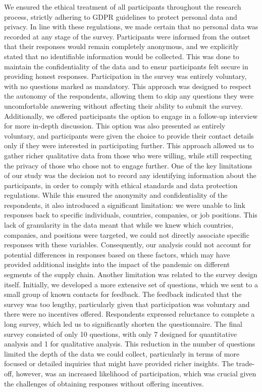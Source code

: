We ensured the ethical treatment of all participants throughout the research process, strictly adhering to GDPR guidelines to protect personal data and privacy. In line with these regulations, we made certain that no personal data was recorded at any stage of the survey. Participants were informed from the outset that their responses would remain completely anonymous, and we explicitly stated that no identifiable information would be collected. This was done to maintain the confidentiality of the data and to ensur participants felt secure in providing honest responses. Participation in the survey was entirely voluntary, with no questions marked as mandatory. This approach was designed to respect the autonomy of the respondents, allowing them to skip any questions they were uncomfortable answering without affecting their ability to submit the survey. Additionally, we offered participants the option to engage in a follow-up interview for more in-depth discussion. This option was also presented as entirely voluntary, and participants were given the choice to provide their contact details only if they were interested in participating further. This approach allowed us to gather richer qualitative data from those who were willing, while still respecting the privacy of those who chose not to engage further. One of the key limitations of our study was the decision not to record any identifying information about the participants, in order to comply with ethical standards and data protection regulations. While this ensured the anonymity and confidentiality of the respondents, it also introduced a significant limitation: we were unable to link responses back to specific individuals, countries, companies, or job positions. This lack of granularity in the data meant that while we knew which countries, companies, and positions were targeted, we could not directly associate specific responses with these variables. Consequently, our analysis could not account for potential differences in responses based on these factors, which may have provided additional insights into the impact of the pandemic on different segments of the supply chain. Another limitation was related to the survey design itself. Initially, we developed a more extensive set of questions, which we sent to a small group of known contacts for feedback. The feedback indicated that the survey was too lengthy, particularly given that participation was voluntary and there were no incentives offered. Respondents expressed reluctance to complete a long survey, which led us to significantly shorten the questionnaire. The final survey consisted of only 10 questions, with only 7 designed for quantitative analysis and 1 for qualitative analysis. This reduction in the number of questions limited the depth of the data we could collect, particularly in terms of more focused or detailed inquiries that might have provided richer insights. The trade-off, however, was an increased likelihood of participation, which was crucial given the challenges of obtaining responses without offering incentives.

